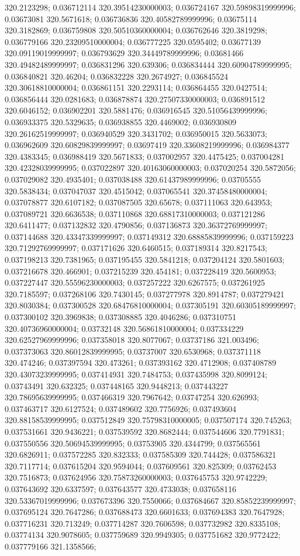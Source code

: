320.2123298; 0.036712114 320.39514230000003; 0.036724167 320.59898319999996; 0.03673081 320.5671618; 0.036736836 320.40582789999996; 0.03675114 320.3182869; 0.036759808 320.50510360000004; 0.036762646 320.3819298; 0.036779166 320.23209510000004; 0.036777225 320.0595402; 0.03677139 320.09119019999997; 0.036793629 320.34449789999996; 0.03681466 320.49482489999997; 0.036831296 320.639306; 0.036834444 320.60904789999995; 0.036840821 320.46204; 0.036832228 320.2674927; 0.036845524 320.30618810000004; 0.036861151 320.2293114; 0.036864455 320.0427514; 0.036856444 320.0281683; 0.036878874 320.27507330000003; 0.036891512 320.6046152; 0.036902201 320.5881476; 0.036916545 320.51056439999996; 0.036933375 320.5329635; 0.036938855 320.4469002; 0.036930809 320.26162519999997; 0.036940529 320.3431702; 0.036950015 320.5633073; 0.036962609 320.60829839999997; 0.03697419 320.33608219999996; 0.036984377 320.4383345; 0.036988419 320.5671833; 0.037002957 320.4475425; 0.037004281 320.42328039999995; 0.037022897 320.40163060000003; 0.037020254 320.5872056; 0.037029082 320.4935401; 0.037038488 320.61437989999996; 0.03705555 320.5838434; 0.037047037 320.4515042; 0.037065541 320.37458480000004; 0.037078877 320.6107182; 0.037087505 320.65678; 0.037111063 320.643953; 0.037089721 320.6636538; 0.037110868 320.68817310000003; 0.037121286 320.6411477; 0.037132832 320.4790856; 0.037136873 320.36372769999997; 0.037144688 320.43347339999997; 0.037149312 320.68885839999996; 0.037159223 320.71292769999997; 0.037171626 320.6460515; 0.037189314 320.8217543; 0.037198213 320.7381965; 0.037195455 320.5841218; 0.037204124 320.5801603; 0.037216678 320.466901; 0.037215239 320.454181; 0.037228419 320.5600953; 0.037227447 320.55596230000003; 0.037257222 320.6267575; 0.037261925 320.7185597; 0.037268106 320.7430145; 0.037277978 320.8914787; 0.037279421 320.8030384; 0.037300528 320.68476810000004; 0.037305191 320.60305189999997; 0.037300102 320.3969838; 0.037308885 320.4046286; 0.037310751 320.40736960000004; 0.03732148 320.56861810000004; 0.037334229 320.62527969999996; 0.037358018 320.8077067; 0.03737186 321.003496; 0.037373063 320.86012839999995; 0.03737007 320.6530968; 0.037371118 320.474246; 0.037397594 320.473261; 0.037393162 320.4712908; 0.037408789 320.43073239999995; 0.037414931 320.7484753; 0.037435998 320.8099124; 0.03743491 320.632325; 0.037448165 320.9448213; 0.037443227 320.78695639999995; 0.037466319 320.7967642; 0.03747254 320.626993; 0.037463717 320.6127524; 0.037489602 320.7756926; 0.037493604 320.88158539999995; 0.037512849 320.75798310000005; 0.037507174 320.745263; 0.037531661 320.9436221; 0.037539592 320.8682444; 0.037544606 320.7791831; 0.037550556 320.50694539999995; 0.03753905 320.4344799; 0.037565561 320.6826911; 0.037572285 320.832333; 0.037585309 320.744428; 0.037586321 320.7117714; 0.037615204 320.9594044; 0.037609561 320.825309; 0.03762453 320.7516873; 0.037624956 320.75873260000003; 0.037645753 320.9742229; 0.037643692 320.6337597; 0.037643577 320.4733038; 0.037658116 320.53367019999996; 0.037673396 320.7550066; 0.037684667 320.85852239999997; 0.037695124 320.7647286; 0.037688473 320.6601633; 0.037694383 320.7647928; 0.037716231 320.713249; 0.037714287 320.7606598; 0.037732982 320.8335108; 0.03774134 320.9078605; 0.037759689 320.9949305; 0.037751682 320.9772422; 0.037779166 321.1358566; 